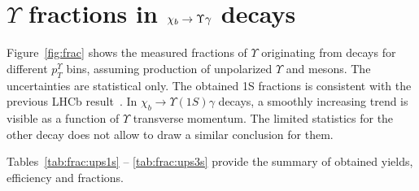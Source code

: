\section{\texorpdfstring{$\Upsilon$}{Y} fractions in \texorpdfstring{$\chi_{b} \rightarrow \Upsilon \gamma$}{chib --> Y gamma} decays}
\label{sec:fraction}

Figure~\ref{fig:frac} shows the measured fractions of $\Upsilon$ originating
from \chib decays for different $p_T^{\Upsilon}$ bins,  assuming production of
unpolarized $\Upsilon$ and \chib mesons. The uncertainties are statistical
only. The obtained \Y1S fractions is consistent with the previous LHCb
result~\cite{LHCb-PAPER-2012-015}. In $\chi_b \rightarrow \Upsilon(1S) \gamma$
decays, a smoothly increasing trend is visible as a function of $\Upsilon$
transverse momentum. The limited statistics for the other decay does not allow
to draw a similar conclusion for them.




Tables~\ref{tab:frac:ups1s} -- \ref{tab:frac:ups3s} provide the summary
of obtained yields, efficiency and fractions.


